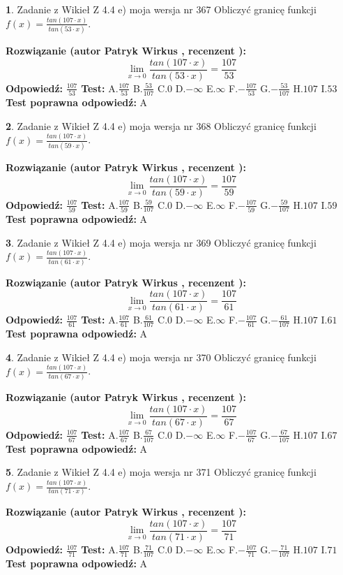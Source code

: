 \documentclass[12pt, a4paper]{article}
\theoremstyle{definition} %
\newtheorem{zad}{}
\newcommand{\zadStart}[1]{\begin{zad}#1\newline}
\newcommand{\zadStop}{\end{zad}}
\newcommand{\rozwStart}[2]{\noindent \textbf{Rozwiązanie (autor #1 , recenzent #2): }\newline}
\newcommand{\rozwStop}{\newline}
\newcommand{\odpStart}{\noindent \textbf{Odpowiedź:}\newline}
\newcommand{\odpStop}{\newline}
\newcommand{\testStart}{\noindent \textbf{Test:}\newline}
\newcommand{\testStop}{\newline}
\newcommand{\kluczStart}{\noindent \textbf{Test poprawna odpowiedź:}\newline}
\newcommand{\kluczStop}{\newline}
\begin{document}
\zadStart{Zadanie z Wikieł Z 4.4 e) moja wersja nr 367}
Obliczyć granicę funkcji $f(x)=\frac{tan(107\cdot x)}{tan(53\cdot x)}$.
\zadStop
\rozwStart{Patryk Wirkus}{}
$$\lim\limits_{x\to 0}\frac{tan(107\cdot x)}{tan(53\cdot x)}=
\frac{107}{53}$$
\rozwStop
\odpStart
$\frac{107}{53}$
\odpStop
\testStart
A.$\frac{107}{53}$
B.$\frac{53}{107}$
C.$0$
D.$-\infty$
E.$\infty$
F.$-\frac{107}{53}$
G.$-\frac{53}{107}$
H.$107$
I.$53$
\testStop
\kluczStart
A
\kluczStop



\zadStart{Zadanie z Wikieł Z 4.4 e) moja wersja nr 368}
Obliczyć granicę funkcji $f(x)=\frac{tan(107\cdot x)}{tan(59\cdot x)}$.
\zadStop
\rozwStart{Patryk Wirkus}{}
$$\lim\limits_{x\to 0}\frac{tan(107\cdot x)}{tan(59\cdot x)}=
\frac{107}{59}$$
\rozwStop
\odpStart
$\frac{107}{59}$
\odpStop
\testStart
A.$\frac{107}{59}$
B.$\frac{59}{107}$
C.$0$
D.$-\infty$
E.$\infty$
F.$-\frac{107}{59}$
G.$-\frac{59}{107}$
H.$107$
I.$59$
\testStop
\kluczStart
A
\kluczStop



\zadStart{Zadanie z Wikieł Z 4.4 e) moja wersja nr 369}
Obliczyć granicę funkcji $f(x)=\frac{tan(107\cdot x)}{tan(61\cdot x)}$.
\zadStop
\rozwStart{Patryk Wirkus}{}
$$\lim\limits_{x\to 0}\frac{tan(107\cdot x)}{tan(61\cdot x)}=
\frac{107}{61}$$
\rozwStop
\odpStart
$\frac{107}{61}$
\odpStop
\testStart
A.$\frac{107}{61}$
B.$\frac{61}{107}$
C.$0$
D.$-\infty$
E.$\infty$
F.$-\frac{107}{61}$
G.$-\frac{61}{107}$
H.$107$
I.$61$
\testStop
\kluczStart
A
\kluczStop



\zadStart{Zadanie z Wikieł Z 4.4 e) moja wersja nr 370}
Obliczyć granicę funkcji $f(x)=\frac{tan(107\cdot x)}{tan(67\cdot x)}$.
\zadStop
\rozwStart{Patryk Wirkus}{}
$$\lim\limits_{x\to 0}\frac{tan(107\cdot x)}{tan(67\cdot x)}=
\frac{107}{67}$$
\rozwStop
\odpStart
$\frac{107}{67}$
\odpStop
\testStart
A.$\frac{107}{67}$
B.$\frac{67}{107}$
C.$0$
D.$-\infty$
E.$\infty$
F.$-\frac{107}{67}$
G.$-\frac{67}{107}$
H.$107$
I.$67$
\testStop
\kluczStart
A
\kluczStop



\zadStart{Zadanie z Wikieł Z 4.4 e) moja wersja nr 371}
Obliczyć granicę funkcji $f(x)=\frac{tan(107\cdot x)}{tan(71\cdot x)}$.
\zadStop
\rozwStart{Patryk Wirkus}{}
$$\lim\limits_{x\to 0}\frac{tan(107\cdot x)}{tan(71\cdot x)}=
\frac{107}{71}$$
\rozwStop
\odpStart
$\frac{107}{71}$
\odpStop
\testStart
A.$\frac{107}{71}$
B.$\frac{71}{107}$
C.$0$
D.$-\infty$
E.$\infty$
F.$-\frac{107}{71}$
G.$-\frac{71}{107}$
H.$107$
I.$71$
\testStop
\kluczStart
A
\kluczStop
\end{document}
